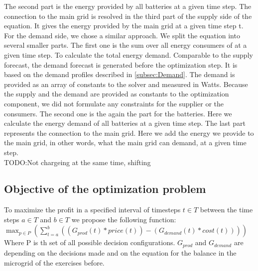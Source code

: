 The second part is the energy provided by all batteries at a given time step.
The connection to the main grid is resolved in the third part of the supply side of the equation.
It gives the energy provided by the main grid at a given time step t.\\
For the demand side, we chose a similar approach.
We split the equation into several smaller parts.
The first one is the sum over all energy consumers of at a given time step. To calculate the total energy demand. Comparable to the supply forecast, the demand forecast is generated before the optimization step. It is based on the demand profiles described in \cref{subsec:Demand}. The demand is provided as an array of constants to the solver and measured in Watts. Because the supply and the demand are provided as constants to the optimization component, we did not formulate any constraints for the supplier or the consumers.
The second one is the again the part for the batteries.
Here we calculate the energy demand of all batteries at a given time step.
The last part represents the connection to the main grid.
Here we add the energy we provide to the main grid, in other words, what the main grid can demand, at a given time step.\\
TODO:Not chargeing at the same time,
shifting
\subsection{Objective of the optimization problem}
To maximize the profit in a specified interval of timesteps $t \in T$ between the time steps $a \in T$ and $b \in T$ we propose the following function:\\
$\max_{p \in P}{(\sum_{t=a}^{b}{((G_{prod}(t)*price(t))-(G_{demand}(t)*cost(t)))})}$\\
Where P is th set of all possible decision configurations. $G_{prod}$ and $G_{demand}$ are depending on the decisions made and on the equation for the balance in the microgrid of the exercises before.
